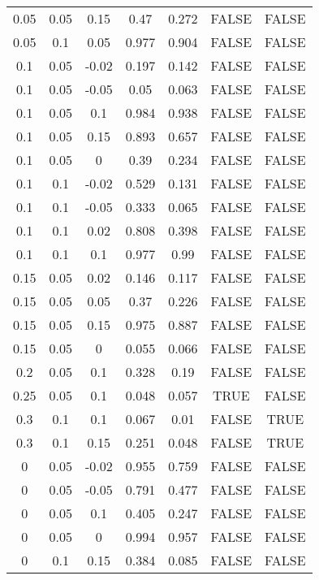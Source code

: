 \documentclass[
10pt, %
a4paper, %
oneside, %
headinclude,footinclude, %
BCOR5mm, %
]{scrartcl}
\begin{document}
\begin{table}[H]
\begin{tabular}{|c|c|c|c|c|c|c|}
		0.05  & 0.05  & 0.15  & 0.47       & 0.272     & FALSE      & FALSE     \\
		0.05  & 0.1   & 0.05  & 0.977      & 0.904     & FALSE      & FALSE     \\
		0.1   & 0.05  & -0.02 & 0.197      & 0.142     & FALSE      & FALSE     \\
		0.1   & 0.05  & -0.05 & 0.05       & 0.063     & FALSE      & FALSE     \\
		0.1   & 0.05  & 0.1   & 0.984      & 0.938     & FALSE      & FALSE     \\
		0.1   & 0.05  & 0.15  & 0.893      & 0.657     & FALSE      & FALSE     \\
		0.1   & 0.05  & 0     & 0.39       & 0.234     & FALSE      & FALSE     \\
		0.1   & 0.1   & -0.02 & 0.529      & 0.131     & FALSE      & FALSE     \\
		0.1   & 0.1   & -0.05 & 0.333      & 0.065     & FALSE      & FALSE     \\
		0.1   & 0.1   & 0.02  & 0.808      & 0.398     & FALSE      & FALSE     \\
		0.1   & 0.1   & 0.1   & 0.977      & 0.99      & FALSE      & FALSE     \\
		0.15  & 0.05  & 0.02  & 0.146      & 0.117     & FALSE      & FALSE     \\
		0.15  & 0.05  & 0.05  & 0.37       & 0.226     & FALSE      & FALSE     \\
		0.15  & 0.05  & 0.15  & 0.975      & 0.887     & FALSE      & FALSE     \\
		0.15  & 0.05  & 0     & 0.055      & 0.066     & FALSE      & FALSE     \\
		0.2   & 0.05  & 0.1   & 0.328      & 0.19      & FALSE      & FALSE     \\
		0.25  & 0.05  & 0.1   & 0.048      & 0.057     & TRUE       & FALSE     \\
		0.3   & 0.1   & 0.1   & 0.067      & 0.01      & FALSE      & TRUE      \\
		0.3   & 0.1   & 0.15  & 0.251      & 0.048     & FALSE      & TRUE      \\
		0     & 0.05  & -0.02 & 0.955      & 0.759     & FALSE      & FALSE     \\
		0     & 0.05  & -0.05 & 0.791      & 0.477     & FALSE      & FALSE     \\
		0     & 0.05  & 0.1   & 0.405      & 0.247     & FALSE      & FALSE     \\
		0     & 0.05  & 0     & 0.994      & 0.957     & FALSE      & FALSE     \\
		0     & 0.1   & 0.15  & 0.384      & 0.085     & FALSE      & FALSE  \\
		\hline  
	\end{tabular}
\end{table}
\end{document}
